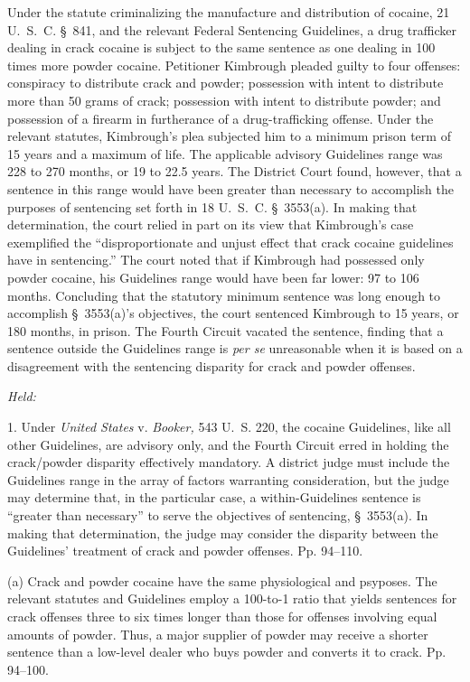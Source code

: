
\setcounter{page}{85}

\noindent Under the statute criminalizing the manufacture and distribution of
cocaine, 21 U.~S.~C. \S~841, and the relevant Federal Sentencing
Guidelines, a drug trafficker dealing in crack cocaine is subject to
the same sentence as one dealing in 100 times more powder cocaine.
Petitioner Kimbrough pleaded guilty to four offenses: conspiracy to
distribute crack and powder; possession with intent to distribute
more than 50 grams of crack; possession with intent to distribute
powder; and possession of a firearm in furtherance of a drug-trafficking
offense. Under the relevant statutes, Kimbrough's plea subjected
him to a minimum prison term of 15 years and a maximum of life. The
applicable advisory Guidelines range was 228 to 270 months, or 19 to
22.5 years. The District Court found, however, that a sentence in
this range would have been greater than necessary to accomplish the
purposes of sentencing set forth in 18 U.~S.~C. \S~3553(a). In
making that determination, the court relied in part on its view that
Kimbrough's case exemplified the ``disproportionate and unjust effect
that crack cocaine guidelines have in sentencing.'' The court noted
that if Kimbrough had possessed only powder cocaine, his Guidelines
range would have been far lower: 97 to 106 months. Concluding that the
statutory minimum sentence was long enough to accomplish \S~3553(a)'s
objectives, the court sentenced Kimbrough to 15 years, or 180 months, in
prison. The Fourth Circuit vacated the sentence, finding that a sentence
outside the Guidelines range is \emph{per se} unreasonable when it is based
on a disagreement with the sentencing disparity for crack and powder
offenses.

\emph{Held:}

  1. Under \emph{United States} v. \emph{Booker,} 543 U.~S. 220, the
cocaine Guidelines, like all other Guidelines, are advisory only,
and the Fourth Circuit erred in holding the crack/powder disparity
effectively mandatory. A district judge must include the Guidelines
range in the array of factors warranting consideration, but the judge
may determine that, in the particular case, a within-Guidelines sentence
is ``greater than necessary'' to serve the objectives of sentencing,
\S~3553(a). In making that determination, the judge may consider the
disparity between the Guidelines' treatment of crack and powder
offenses. Pp. 94--110.

  (a) Crack and powder cocaine have the same physiological and
psy\newpage poses. The relevant statutes and Guidelines employ a 100-to-1
ratio that yields sentences for crack offenses three to six times longer
than those for offenses involving equal amounts of powder. Thus, a major
supplier of powder may receive a shorter sentence than a low-level
dealer who buys powder and converts it to crack. Pp. 94--100.

